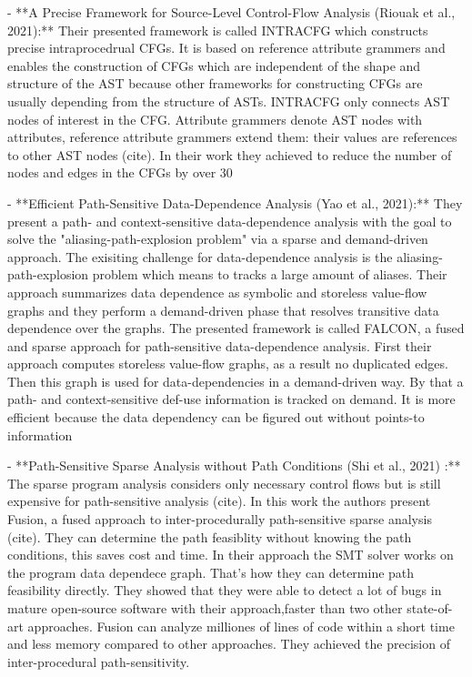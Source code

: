 - **A Precise Framework for Source-Level Control-Flow Analysis (Riouak et al., 2021):** Their presented framework is called INTRACFG which constructs precise intraprocedrual CFGs. It is based on reference 
attribute grammers and enables the construction of CFGs which are independent of the shape and structure of the AST because other frameworks for constructing CFGs are usually depending from the structure of ASTs. 
INTRACFG only connects AST nodes of interest in the CFG. Attribute grammers denote AST nodes with attributes, reference attribute grammers extend them: their values are references to other AST nodes (cite). 
In their work they achieved to reduce the number of nodes and edges in the CFGs by over 30%

- **Efficient Path-Sensitive Data-Dependence Analysis (Yao et al., 2021):** They present a path- and context-sensitive data-dependence analysis with the goal to solve the "aliasing-path-explosion problem" 
via a sparse and demand-driven approach. The exisiting challenge for data-dependence analysis is the aliasing-path-explosion problem which means to tracks a large amount of aliases. Their approach summarizes 
data dependence as symbolic and storeless value-flow graphs and they perform a demand-driven phase that resolves transitive data dependence over the graphs. The presented framework is called FALCON, a fused and 
sparse approach for path-sensitive data-dependence analysis. First their approach computes storeless value-flow graphs, as a result no duplicated edges. Then this graph is used for data-dependencies in a 
demand-driven way. By that a path- and context-sensitive def-use information is tracked on demand. It is more efficient because the data dependency can be figured out without points-to information 

- **Path-Sensitive Sparse Analysis without Path Conditions (Shi et al., 2021) :** The sparse program analysis considers only necessary control flows but is still expensive for path-sensitive analysis (cite). 
In this work the authors present Fusion, a fused approach to inter-procedurally path-sensitive sparse analysis (cite). They can determine the path feasiblity without knowing the path conditions, 
this saves cost and time. In their approach the SMT solver works on the program data dependece graph. That's how they can determine path feasibility directly.
They showed that they were able to detect a lot of bugs in mature open-source software with their approach,faster than two other state-of-art approaches. Fusion can analyze milliones of lines of code within a 
short time and less memory compared to other approaches. They achieved the precision of inter-procedural path-sensitivity.
